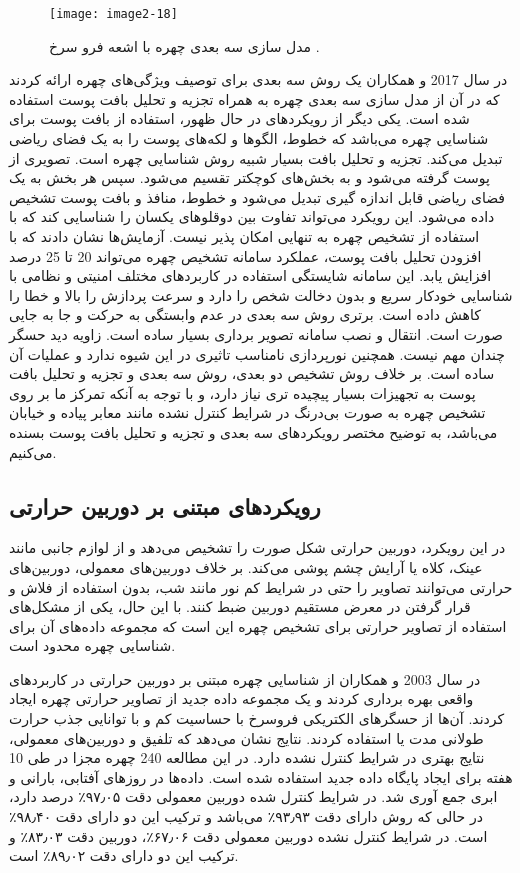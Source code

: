 \begin{figure}[h]
\centering
  \texttt{[image: image2-18]}
  \caption{مدل سازی سه بعدی چهره با اشعه فرو سرخ \cite{10.3745/JIPS.2009.5.2.041}.}
  \label{image2-18}
\end{figure}

\noindent
در سال 2017  و همکاران \cite{HU2017366} یک روش سه بعدی برای توصیف ویژگی‌های چهره ارائه کردند که در آن از مدل سازی سه بعدی چهره به همراه تجزیه و تحلیل بافت پوست استفاده شده است. یکی دیگر از رویکردهای در حال ظهور، استفاده از بافت پوست برای شناسایی چهره می‌باشد که خطوط، الگوها و لکه‌های پوست را به یک فضای ریاضی تبدیل می‌کند. تجزیه و تحلیل بافت بسیار شبیه روش شناسایی چهره است. تصویری از پوست گرفته می‌شود و به بخش‌های کوچکتر تقسیم می‌شود. سپس هر بخش به یک فضای ریاضی قابل اندازه گیری تبدیل می‌شود و خطوط، منافذ و بافت پوست تشخیص داده می‌شود. این رویکرد می‌تواند تفاوت بین دوقلوهای یکسان را شناسایی کند که با استفاده از تشخیص چهره به تنهایی امکان پذیر نیست. آزمایش‌ها نشان دادند که با افزودن تحلیل بافت پوست، عملکرد سامانه تشخیص چهره می‌تواند 20 تا 25 درصد افزایش یابد. این سامانه شایستگی استفاده در کاربردهای مختلف امنیتی و نظامی با شناسایی خودکار سریع و بدون دخالت شخص را دارد و سرعت پردازش را بالا و خطا را کاهش داده است. برتری روش سه بعدی در عدم وابستگی به حرکت و جا به جایی صورت است. انتقال و نصب سامانه تصویر برداری بسیار ساده است. زاویه دید حسگر چندان مهم نیست. همچنین نورپردازی نامناسب تاثیری در این شیوه ندارد و عملیات آن ساده است. بر خلاف روش تشخیص دو بعدی، روش سه بعدی و تجزیه و تحلیل بافت پوست به تجهیزات بسیار پیچیده تری نیاز دارد، و با توجه به آنکه تمرکز ما بر روی تشخیص چهره به صورت بی‌درنگ در شرایط کنترل نشده مانند معابر پیاده و خیابان می‌باشد، به توضیح مختصر رویکردهای سه بعدی و تجزیه و تحلیل بافت پوست بسنده می‌کنیم.

\subsection{رویکرد‌های مبتنی بر دوربین حرارتی}
در این رویکرد، دوربین حرارتی شکل صورت را تشخیص می‌دهد و از لوازم جانبی مانند عینک، کلاه یا آرایش چشم پوشی می‌کند. بر خلاف دوربین‌های معمولی، دوربین‌های حرارتی می‌توانند تصاویر را حتی در شرایط کم نور مانند شب، بدون استفاده از فلاش و قرار گرفتن در معرض مستقیم دوربین ضبط کنند. با این حال، یکی از مشکل‌های استفاده از تصاویر حرارتی برای تشخیص چهره این است که مجموعه داده‌های آن برای شناسایی چهره محدود است.

\noindent
در سال 2003  و همکاران \cite{SOCOLINSKY200372} از شناسایی چهره مبتنی بر دوربین حرارتی در کاربردهای واقعی بهره برداری کردند و یک مجموعه داده جدید از تصاویر حرارتی چهره ایجاد کردند. آن‌ها از حسگرهای الکتریکی فروسرخ با حساسیت کم و با توانایی جذب حرارت طولانی مدت یا   استفاده کردند. نتایج نشان می‌دهد که تلفیق  و دوربین‌های معمولی، نتایج بهتری در شرایط کنترل نشده دارد. در این مطالعه 240 چهره مجزا در طی 10 هفته برای ایجاد پایگاه داده جدید استفاده شده است. داده‌ها در روزهای آفتابی، بارانی و ابری جمع آوری شد. در شرایط کنترل شده دوربین معمولی دقت ۹۷٫۰۵٪ درصد دارد، در حالی که روش  دارای دقت ۹۳٫۹۳٪ می‌باشد و ترکیب این دو دارای دقت ۹۸٫۴۰٪ است. در شرایط کنترل نشده دوربین معمولی دقت ۶۷٫۰۶٪، دوربین  دقت ۸۳٫۰۳٪ و ترکیب این دو دارای دقت ۸۹٫۰۲٪ است.

